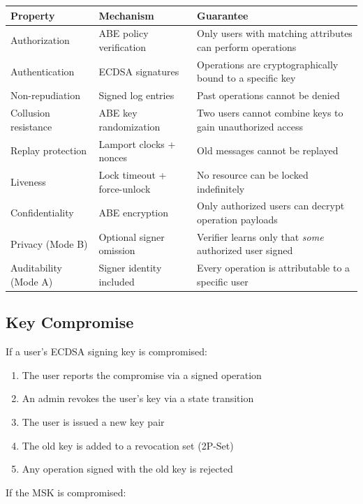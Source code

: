 \documentclass[sigconf,nonacm]{acmart}
\begin{document}
\vspace{4pt}
\begin{tabularx}{\columnwidth}{l>{\hsize=0.9\hsize}X>{\hsize=1.1\hsize}X}
\toprule
\textbf{Property} & \textbf{Mechanism} & \textbf{Guarantee} \\
\midrule
Authorization & ABE policy verification & Only users with matching attributes can perform operations \\
Authentication & ECDSA signatures & Operations are cryptographically bound to a specific key \\
Non-repudiation & Signed log entries & Past operations cannot be denied \\
Collusion resistance & ABE key randomization & Two users cannot combine keys to gain unauthorized access \\
Replay protection & Lamport clocks + nonces & Old messages cannot be replayed \\
Liveness & Lock timeout + force-unlock & No resource can be locked indefinitely \\
Confidentiality & ABE encryption & Only authorized users can decrypt operation payloads \\
Privacy (Mode B) & Optional signer omission & Verifier learns only that \textit{some} authorized user signed \\
Auditability (Mode A) & Signer identity included & Every operation is attributable to a specific user \\
\bottomrule
\end{tabularx}

\subsection{Key Compromise}

If a user's ECDSA signing key is compromised:

\begin{enumerate}
    \item The user reports the compromise via a signed operation
    \item An admin revokes the user's key via a state transition
    \item The user is issued a new key pair
    \item The old key is added to a revocation set (2P-Set)
    \item Any operation signed with the old key is rejected
\end{enumerate}

If the MSK is compromised:
\end{document}
